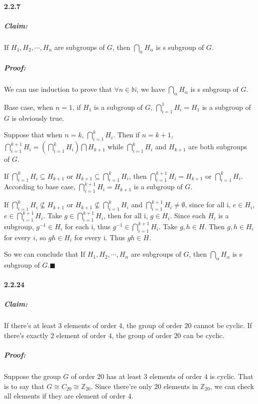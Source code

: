\documentclass[11pt]{article}
\begin{document}
\paragraph{2.2.7}
	\subparagraph{Claim:} If $H_1, H_2, \cdots, H_n$ are subgroups of $G$, then $\bigcap_{\alpha}H_{\alpha}$ is s subgroup of $G$.
	\subparagraph{Proof:}
		 We can use induction to prove that $\forall n \in \mathbb{N}$, we have $\bigcap_{\alpha}H_{\alpha}$ is s subgroup of $G$.
		 
		 Base case, when $n = 1$, if $H_1$ is a subgroup of $G$, $\bigcap_{i = 1}^1H_{i} = H_1$ is a subgroup of $G$ is obviously true.
		 
		 Suppose that when $n = k$, $\bigcap_{i = 1}^kH_{i}$. Then if $n = k + 1$, $\bigcap_{i = 1}^{k + 1}H_{i} = (\bigcap_{i = 1}^{k}H_{i}) \bigcap H_{k + 1}$ while $\bigcap_{i = 1}^{k}H_{i}$ and $H_{k+1}$ are both subgroups of $G$.
		 
		 If $\bigcap_{i = 1}^{k}H_{i} \subseteq H_{k+1}$ or $H_{k+1} \subseteq \bigcap_{i = 1}^{k}H_{i}$, then $\bigcap_{i = 1}^{k + 1}H_{i} = H_{k+1}$ or $\bigcap_{i = 1}^{k}H_{i}$. According to base case, $\bigcap_{i = 1}^{k + 1}H_{i} = H_{k+1}$ is a subgroup of $G$.
		 
		 If $\bigcap_{i = 1}^{k}H_{i} \nsubseteq H_{k+1}$ or $H_{k+1} \nsubseteq \bigcap_{i = 1}^{k}H_{i}$ and $\bigcap_{i = 1}^{k + 1}H_{i} \neq \emptyset$, since for all i, $e \in H_i$, $e \in \bigcap_{i = 1}^{k + 1}H_{i}$. Take $g \in \bigcap_{i = 1}^{k + 1}H_{i}$, then for all i, $g \in H_i$. Since each $H_i$ is a subgroup, $g^{-1} \in H_i$ for each i, thus $g^{-1} \in \bigcap_{i = 1}^{k + 1}H_{i}$. Take $g, h \in H$. Then $g, h \in H_i$ for every $i$, so $gh \in H_i$ for every i. Thus $gh \in H$.
		 
		 So we can conclude that If $H_1, H_2, \cdots, H_n$ are subgroups of $G$, then $\bigcap_{\alpha}H_{\alpha}$ is s subgroup of $G$.$\blacksquare$
		
\paragraph{2.2.24}
	\subparagraph{Claim:} If there's at least $3$ elements of order $4$, the group of order $20$ cannot be cyclic. If there's exactly $2$ element of order $4$, the group of order $20$ can be cyclic.
	\subparagraph{Proof:} Suppose the group $G$ of order 20 has at least $3$ elements of order $4$ is cyclic. That is to say that $G \cong C_{20} \cong \mathbb{Z}_{20}$. Since there're only $20$ elements in $\mathbb{Z}_{20}$, we can check all elements if they are element of order $4$. 
	
\end{document}

